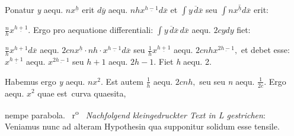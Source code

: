 %
\rule[0mm]{0pt}{5mm}%
Ponatur \textit{y} aequ. $nx^{\underline{h}}$
erit
$d\overline{y}$ aequ. $nhx^{\underline{h-1}}d\overline{x}$
et
$\displaystyle\!\!\int\!\!\overline{y\,d\overline{x}}$
seu
$\displaystyle\!\!\int\!\!\overline{nx^{\underline{h}}d\overline{x}}$
erit:
\rule[0mm]{0pt}{5mm}%
$\displaystyle\frac{n}{h}x^{\underline{h+1}}.$
Ergo pro aequatione differentiali:\protect{}
$\displaystyle\!\!\int\!\!\overline{y\,d\overline{x}}\,d\overline{x}$ aequ. $2cydy$
fiet: \rule[0mm]{0pt}{5mm}%
$\displaystyle\frac{n}{h}x^{h+1}d\overline{x}$ aequ. $2cnx^{\underline{h}}\cdot nh\cdot x^{\underline{h-1}}d\overline{x}$
seu
$\displaystyle\frac{1}{h}x^{\underline{h+1}}$ aequ. $2cnhx^{\underline{2h-1}},$
et debet esse:
$x^{\underline{h+1}}$ aequ. $x^{\underline{2h-1}}$ seu $h+1$ aequ. $2h-1.$
Fiet \textit{h} aequ. 2.
\protect\rule[-2mm]{0mm}{6mm}Habemus ergo \textit{y} aequ. $nx^2.$
Est autem $\displaystyle\frac{1}{h}$ aequ. $2cnh,$
seu
%
seu \textit{n} aequ. $\displaystyle\frac{1}{2c}.$
Ergo
%
aequ. $x^2$
quae \textlangle est\textrangle\ curva quaesita,\protect{}
\rule[0mm]{0pt}{5mm}%
nempe
%
parabola.\protect{}%
%
%
%
%
~r\textsuperscript{o}\rbrack\ %
%
\pend%
\newpage%
%
\pstart%
\noindent%
\lbrack\textit{Nachfolgend kleingedruckter Text in L gestrichen}:\rbrack\
\pend%
\vspace{0.5em}%
%
\pstart%
\footnotesize%
Veniamus nunc ad
alteram Hypothesin\protect{}
qua supponitur solidum esse tensile.%
